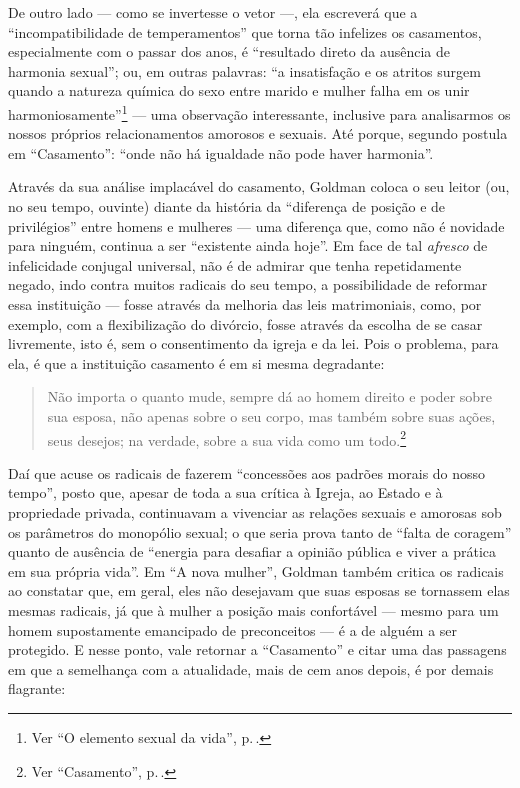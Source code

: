 De outro lado --- como se invertesse o vetor ---,
ela escreverá que a
``incompatibilidade de temperamentos'' que torna tão infelizes os
casamentos, especialmente com o passar dos anos, é ``resultado direto da
ausência de harmonia sexual''; ou, em outras palavras: ``a insatisfação
e os atritos surgem quando a natureza química do sexo entre marido e
mulher falha em os unir harmoniosamente''\footnote{Ver ``O elemento sexual da vida'', p.\,\pageref{unir}.} --- uma observação
interessante, inclusive para analisarmos os nossos próprios
relacionamentos amorosos e sexuais. Até porque, segundo postula em
``Casamento'': ``onde não há igualdade não pode haver harmonia''.

Através da sua análise implacável do casamento, Goldman coloca o seu
leitor (ou, no seu tempo, ouvinte) diante da história da ``diferença de
posição e de privilégios'' entre homens e mulheres ---
uma diferença que, como não é novidade para ninguém, continua a ser
``existente ainda hoje''. Em face de tal \textit{afresco} de infelicidade
conjugal universal, não é de admirar que tenha repetidamente negado,
indo contra muitos radicais do seu tempo, a possibilidade de reformar
essa instituição --- fosse através da melhoria das leis
matrimoniais, como, por exemplo, com a flexibilização do divórcio, fosse
através da escolha de se casar livremente, isto é, sem o consentimento
da igreja e da lei. Pois o problema, para ela, é que a instituição
casamento é em si mesma degradante:

\begin{quote}
Não importa o quanto mude, sempre dá ao homem direito e poder sobre sua esposa, não apenas sobre o seu corpo, mas também sobre suas ações, seus desejos; na verdade, sobre a
sua vida como um todo.\footnote{Ver ``Casamento'', p.\,\pageref{cruel}.}
\end{quote}

Daí que acuse
os radicais de fazerem ``concessões aos padrões morais do nosso tempo'',
posto que, apesar de toda a sua crítica à Igreja, ao Estado e à
propriedade privada, continuavam a vivenciar as relações sexuais e
amorosas sob os parâmetros do monopólio sexual; o que seria prova tanto
de ``falta de coragem'' quanto de ausência de ``energia para desafiar a
opinião pública e viver a prática em sua própria vida''. Em ``A nova
mulher'', Goldman também critica os radicais ao constatar que, em geral,
eles não desejavam que suas esposas se tornassem elas mesmas radicais,
já que à mulher a posição mais confortável --- mesmo para um homem
supostamente emancipado de preconceitos --- é a de alguém a ser
protegido. E nesse ponto, vale retornar a ``Casamento'' e
citar uma das passagens em que a semelhança com a atualidade, mais de
cem anos depois, é por demais flagrante:

